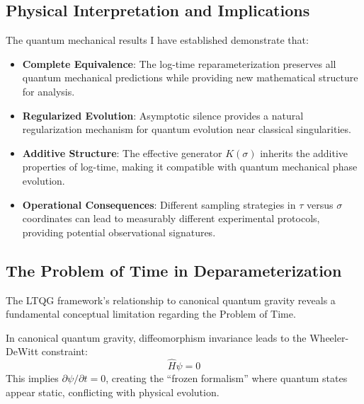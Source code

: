 \subsection{Physical Interpretation and Implications}

The quantum mechanical results I have established demonstrate that:

\begin{itemize}
\item \textbf{Complete Equivalence}: The log-time reparameterization preserves all quantum mechanical predictions while providing new mathematical structure for analysis.

\item \textbf{Regularized Evolution}: Asymptotic silence provides a natural regularization mechanism for quantum evolution near classical singularities.

\item \textbf{Additive Structure}: The effective generator $K(\sigma)$ inherits the additive properties of log-time, making it compatible with quantum mechanical phase evolution.

\item \textbf{Operational Consequences}: Different sampling strategies in $\tau$ versus $\sigma$ coordinates can lead to measurably different experimental protocols, providing potential observational signatures.
\end{itemize}

\subsection{The Problem of Time in Deparameterization}
\label{subsec:problem_of_time}

The LTQG framework's relationship to canonical quantum gravity reveals a fundamental conceptual limitation regarding the Problem of Time.

\begin{definition}
In canonical quantum gravity, diffeomorphism invariance leads to the Wheeler-DeWitt constraint:
\begin{equation}
\hat{H} \psi = 0
\end{equation}
This implies $\partial \psi/\partial t = 0$, creating the ``frozen formalism'' where quantum states appear static, conflicting with physical evolution.
\end{definition}

